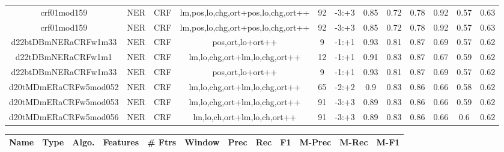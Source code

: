 \documentclass[a4paper]{article}
\begin{document}
\begin{landscape}
\begin{center}
\begin{tabular}{ |c|c|c|c|c|c|c|c|c|c|c|c|}
 
 	
 	\small{ crf01mod159 } & \small{ NER} & \small{  CRF }  & lm,pos,lo,chg,ort+pos,lo,chg,ort++  &  92 &  \small{  -3:+3 }  &  0.85 & 0.72 & 0.78  &  0.92 & 0.57 & 0.63 \\
 	

 
 	
 	\small{ crf01mod159 } & \small{ NER} & \small{  CRF }  & lm,pos,lo,chg,ort+pos,lo,chg,ort++  &  92 &  \small{  -3:+3 }  &  0.85 & 0.72 & 0.78  &  0.92 & 0.57 & 0.63 \\
 	

 
 	
 	\small{ d22btDBmNERaCRFw1m33 } & \small{ NER} & \small{  CRF }  & pos,ort,lo+ort++  &  9 &  \small{  -1:+1 }  &  0.93 & 0.81 & 0.87  &  0.69 & 0.57 & 0.62 \\
 	

 
 	
 	\small{ d22tDBmNERaCRFw1m1 } & \small{ NER} & \small{  CRF }  & lm,lo,chg,ort+lm,lo,chg,ort++  &  12 &  \small{  -1:+1 }  &  0.91 & 0.83 & 0.87  &  0.67 & 0.59 & 0.62 \\
 	

 
 	
 	\small{ d22btDBmNERaCRFw1m33 } & \small{ NER} & \small{  CRF }  & pos,ort,lo+ort++  &  9 &  \small{  -1:+1 }  &  0.93 & 0.81 & 0.87  &  0.69 & 0.57 & 0.62 \\
 	

 
 	
 	\small{ d20tMDmERaCRFw5mod052 } & \small{ NER} & \small{  CRF }  & lm,lo,chg,ort+lm,lo,chg,ort++  &  65 &  \small{  -2:+2 }  &  0.9 & 0.83 & 0.86  &  0.66 & 0.58 & 0.62 \\
 	

 
 	
 	\small{ d20tMDmERaCRFw5mod053 } & \small{ NER} & \small{  CRF }  & lm,lo,chg,ort+lm,lo,chg,ort++  &  91 &  \small{  -3:+3 }  &  0.89 & 0.83 & 0.86  &  0.66 & 0.59 & 0.62 \\
 	

 
 	
 	\small{ d20tMDmERaCRFw5mod056 } & \small{ NER} & \small{  CRF }  & lm,lo,ch,ort+lm,lo,ch,ort++  &  91 &  \small{  -3:+3 }  &  0.89 & 0.83 & 0.86  &  0.66 & 0.6 & 0.62 \\
 	
 \hline
\end{tabular}
\end{center}




\begin{center}
\begin{tabular}{ |c|c|c|c|c|c|c|c|c|c|c|c|} 
 \hline
 	Name & Type & Algo. & Features & \# Ftrs & Window & Prec & Rec & F1 & M-Prec & M-Rec & M-F1\\
 \hline


\end{tabular}
\end{center}
\end{landscape}
\end{document}

